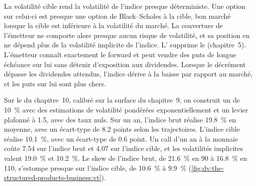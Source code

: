 La volatilité cible rend la volatilité de l'indice presque déterministe. Une option sur celui-ci est presque une option de Black--Scholes à la cible,
bon marché lorsque la cible est inférieure à la volatilité du marché. La couverture de l'émetteur ne comporte alors presque aucun risque de volatilité, et sa position en 
ne dépend plus de la volatilité implicite de l'indice. L' supprime le  (chapitre~5). L'émetteur connaît
exactement le forward et peut vendre des puts de longue échéance sur lui sans détenir d'exposition aux dividendes. Lorsque le décrément dépasse les
dividendes attendus, l'indice dérive à la baisse par rapport au marché, et les puts sur lui sont plus chers.

\begin{example}\label{ex:dv:the-structured-products-business:vt}
Sur le  du chapitre~10, calibré sur la surface du chapitre~9, on construit un  de 10~\% avec des estimations de volatilité
pondérées exponentiellement et un levier plafonné à 1.5, avec des taux nuls. Sur un an, l'indice brut réalise 19.8~\% en moyenne, avec un écart-type
de 8.2 points selon les trajectoires. L'indice cible réalise 10.1~\%, avec un écart-type de 0.6 point. Un call d'un an à la monnaie coûte
7.54 sur l'indice brut et 4.07 sur l'indice cible, et les volatilités implicites valent 19.0~\% et 10.2~\%. Le skew de l'indice brut, de 21.6~\% en
90 à 16.8~\% en 110, s'estompe presque sur l'indice cible, de 10.6~\% à 9.9~\% (\cref{fig:dv:the-structured-products-business:vt}).
\end{example}

